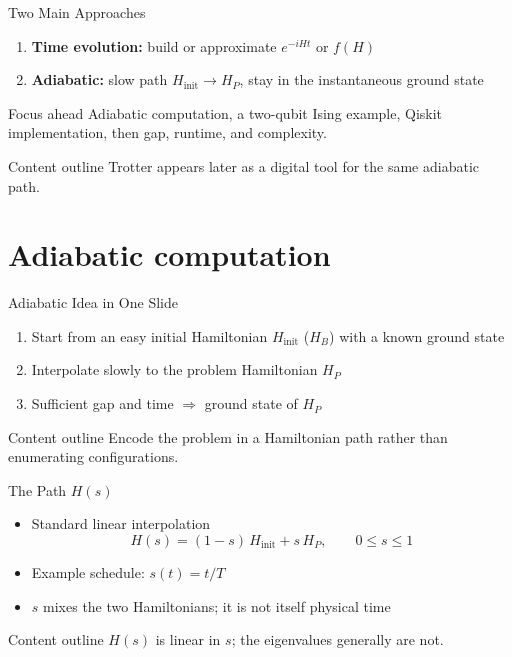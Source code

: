 \documentclass[
	11pt,
	aspectratio=169,
	compress,
]{beamer}
\newcommand{\outlinebox}[1]{%
	\vspace{0.25em}%
	\begin{block}{Content outline}
		#1
	\end{block}
}
\begin{document}
\begin{frame}{Two Main Approaches}
	\begin{enumerate}
		\item \textbf{Time evolution:} build or approximate $e^{-iHt}$ or $f(H)$
		\item \textbf{Adiabatic:} slow path $H_{\mathrm{init}}\to H_P$, stay in the instantaneous ground state
	\end{enumerate}
	\begin{block}{Focus ahead}
		Adiabatic computation, a two-qubit Ising example, Qiskit implementation, then gap, runtime, and complexity.
	\end{block}
	\outlinebox{Trotter appears later as a digital tool for the same adiabatic path.}
\end{frame}

\section{Adiabatic computation}
\begin{frame}{Adiabatic Idea in One Slide}
	\begin{enumerate}
		\item Start from an easy initial Hamiltonian $H_{\mathrm{init}}$ ($H_B$) with a known ground state
		\item Interpolate slowly to the problem Hamiltonian $H_P$
		\item Sufficient gap and time $\Rightarrow$ ground state of $H_P$
	\end{enumerate}
	\outlinebox{Encode the problem in a Hamiltonian path rather than enumerating configurations.}
\end{frame}

\begin{frame}{The Path $H(s)$}
	\begin{itemize}
		\item Standard linear interpolation
		\[
			H(s)=(1-s)\,H_{\mathrm{init}} + s\,H_P,\qquad 0\le s\le 1
		\]
		\item Example schedule: $s(t)=t/T$
		\item $s$ mixes the two Hamiltonians; it is not itself physical time
	\end{itemize}
	\outlinebox{$H(s)$ is linear in $s$; the eigenvalues generally are not.}
\end{frame}
\end{document}
